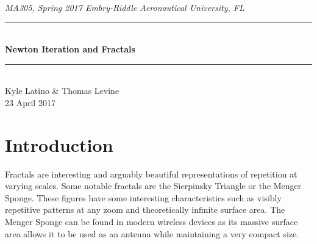 \documentclass[11pt]{article}
\newcommand{\horrule}[1]{\rule{\linewidth}{#1}} 	%
\begin{document}
\begin{center}
{\it MA305, Spring 2017 \hfill Embry-Riddle Aeronautical University, FL 
 }
		\horrule{0.5pt} \\[0.4cm]
		{\bf \Large  Newton Iteration and Fractals}\\
		\horrule{2pt} \\[2cm]
Kyle Latino \& Thomas Levine
\\[0.4cm]
23 April 2017 %
\end{center}

\begin{center}
\end{center}

\thispagestyle{empty}
\newpage
\begin{abstract}

\end{abstract}
\tableofcontents 
\newpage

\section{Introduction}\label{S:1}
Fractals are interesting and arguably beautiful representations of repetition at varying scales. Some notable fractals are the Sierpinsky Triangle or the Menger Sponge. These figures have some interesting characteristics such as visibly repetitive patterns at any zoom and theoretically infinite surface area. The Menger Sponge can be found in modern wireless devices as its massive surface area allows it to be used as an antenna while maintaining a very compact size.
\end{document}
